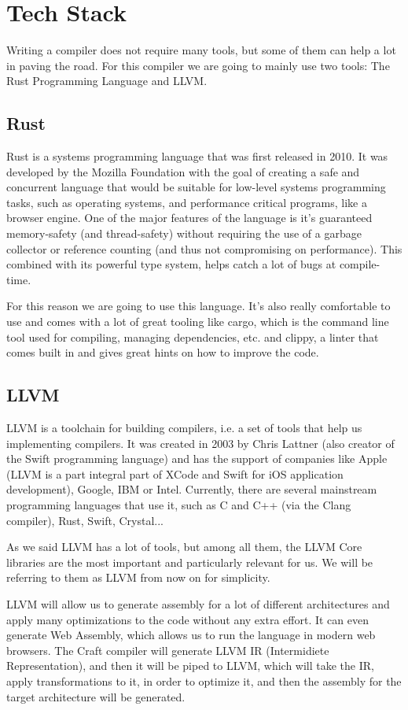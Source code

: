 ﻿\documentclass[10pt,a4paper,twocolumn,twoside]{article}
\begin{document}
\section{Tech Stack}

Writing a compiler does not require many tools, but some of them can help a lot
in paving the road. For this compiler we are going to mainly use two tools: 
The Rust Programming Language and LLVM.

\subsection{Rust}
Rust is a systems programming language that was first released in 2010. It was
developed by the Mozilla Foundation with the goal of creating a safe and
concurrent language that would be suitable for low-level systems programming
tasks, such as operating systems, and performance critical programs, like a
browser engine. One of the major features of the language is it's guaranteed
memory-safety (and thread-safety) without requiring the use of a garbage
collector or reference counting (and thus not compromising on performance).
This combined with its powerful type system, helps catch a lot of bugs at 
compile-time.

For this reason we are going to use this language. It's also really comfortable
to use and comes with a lot of great tooling like cargo, which is the command 
line tool used for compiling, managing dependencies, etc. and clippy, a linter
that comes built in and gives great hints on how to improve the code.

\subsection{LLVM}
LLVM is a toolchain for building compilers, i.e. a set of tools that help us
implementing compilers. It was created in 2003 by Chris Lattner (also creator of
the Swift programming language) and has the support of companies like Apple
(LLVM is a part integral part of XCode and Swift for iOS application
development), Google, IBM or Intel. Currently, there are several mainstream
programming languages that use it, such as C and C++ (via the Clang compiler),
Rust, Swift, Crystal...

As we said LLVM has a lot of tools, but among all them, the LLVM Core libraries
are the most important and particularly relevant for us. We will be referring to 
them as LLVM from now on for simplicity. 

LLVM will allow us to generate assembly for a lot of different architectures
and apply many optimizations to the code without any extra effort. It can even
generate Web Assembly, which allows us to run the language in modern web
browsers. The Craft compiler will generate LLVM IR (Intermidiete
Representation), and then it will be piped to LLVM, which will take the IR,
apply transformations to it, in order to optimize it, and then the assembly for
the target architecture will be generated.
\end{document}
